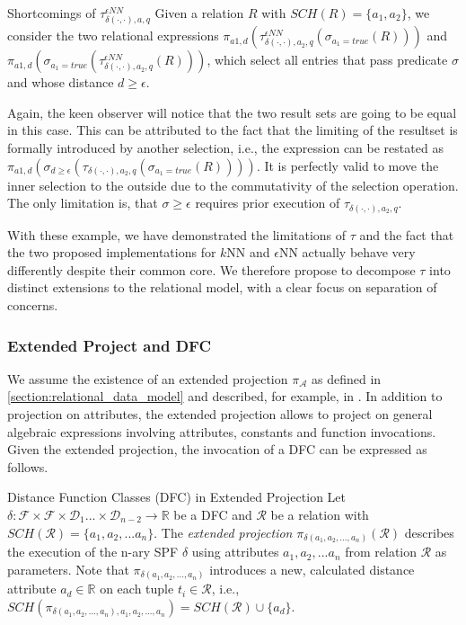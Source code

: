 \begin{example}[label=example:limitsoftauepsilonnn]{Shortcomings of $\tau^{\epsilon NN}_{\delta(\cdot,\cdot),a,q}$}{}
    Given a relation $R$ with $SCH(R) = \{ a_1, a_2 \}$, we consider the two relational expressions $\pi_{a1,d}(\tau^{\epsilon NN}_{\delta(\cdot,\cdot),a_2,q}(\sigma_{a_1 = true}(R)))$ and $\pi_{a1,d}(\sigma_{a_1 = true}(\tau^{\epsilon  NN}_{\delta(\cdot,\cdot),a_2,q}(R)))$, which select all entries that pass predicate $\sigma$ and whose distance $d \geq \epsilon$.
    
    Again, the keen observer will notice that the two result sets are going to be equal in this case. This can be attributed to the fact that the limiting of the resultset is formally introduced by another selection, i.e., the expression can be restated as $\pi_{a1,d}(\sigma_{d \geq \epsilon}(\tau_{\delta(\cdot,\cdot),a_2,q}(\sigma_{a_1 = true}(R))))$. It is perfectly valid to move the inner selection to the outside due to the commutativity of the selection operation. The only limitation is, that  $\sigma \geq \epsilon$ requires prior execution of $\tau_{\delta(\cdot,\cdot),a_2,q}$.
\end{example}

With these example, we have demonstrated the limitations of $\tau$ and the fact that the two proposed implementations for $k$NN and $\epsilon$NN actually behave very differently despite their common core. We therefore propose to decompose $\tau$ into distinct extensions to the relational model, with a clear focus on separation of concerns.

\subsubsection{Extended Project and DFC}

We assume the existence of an extended projection $\pi_{\mathcal{A}}$ as defined in \cref{section:relational_data_model} and described, for example, in \cite{Garcia:2009Database}. In addition to projection on attributes, the extended projection allows to project on general algebraic expressions involving attributes, constants and function invocations. Given the extended projection, the invocation of a DFC can be expressed as follows.

\begin{definition}[label=definition:spf_rel]{Distance Function Classes (DFC) in Extended Projection}{}
Let $\delta \colon \mathcal{F} \times \mathcal{F} \times \mathcal{D}_{1} ... \times \mathcal{D}_{n-2} \to \mathbb{R}$ be a DFC and $\mathcal{R}$ be a relation with $SCH(\mathcal{R}) = \{ a_1, a_2, ... a_{n} \}$. The \emph{extended projection} $\pi_{\delta(a_1,a_2,...,a_n)}(\mathcal{R})$ describes
the execution of the n-ary SPF $\delta$ using attributes $a_1,a_2,...a_n$ from relation $\mathcal{R}$ as parameters. Note that $\pi_{\delta(a_1,a_2,...,a_n)}$ introduces a new, calculated distance attribute $a_d \in \mathbb{R}$ on each tuple $t_i \in \mathcal{R}$, i.e., $SCH(\pi_{\delta(a_1,a_2,...,a_n), a_1, a_2, ..., a_n}) = SCH(\mathcal{R}) \cup \{ a_d \}$.
\end{definition}

